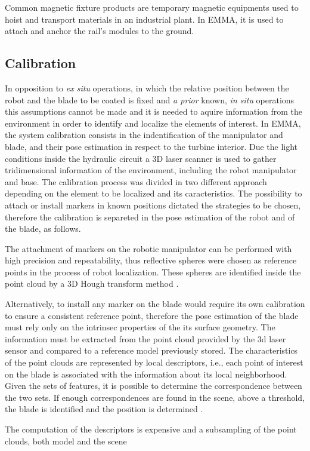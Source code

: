 Common magnetic fixture products are temporary magnetic equipments used to hoist
and transport materials in an industrial plant. In EMMA, it is used to attach
and anchor the rail's modules to the ground.


\subsection{Calibration}

In opposition to \textit{ex situ} operations, in which the relative position
between the robot and the blade to be coated is fixed and \textit{a prior}
known, \textit{in situ} operations this assumptions cannot be made and it
is needed to aquire information from the environment in order to identify
and localize the elements of interest. In EMMA, the system calibration consists
in the indentification of the manipulator and blade, and their
pose estimation in respect to the turbine interior. Due the light conditions
inside the hydraulic circuit  a 3D laser scanner is used to gather
tridimensional information of the environment, including the robot manipulator
and base. The calibration process was divided in two different approach
depending on the element to be localized and its caracteristics. The possibility
to attach or install markers in known positions dictated the strategies to be
chosen, therefore the calibration is separeted in the pose estimation of the
robot and of the blade, as follows.
 
The attachment of markers on the robotic manipulator can be performed with high
precision and repeatability, thus reflective spheres were chosen as reference
points in the process of robot localization. These spheres are identified inside
the point cloud by a 3D Hough transform method \cite{camurri20143d}.

Alternatively, to install any marker on the
blade would require its own calibration to ensure a consistent reference point,
therefore the pose estimation of the blade must rely only on the intrinsec
properties of the its surface geometry. The information must be extracted from
the point cloud provided by the 3d laser sensor and compared to a reference
model previously stored. The characteristics of the point clouds are represented
by local descriptors, i.e., each point of interest on the blade is associated
with the information about its local neighborhood. Given the
sets of features,  it is possible to determine the correspondence between the
two sets. If enough correspondences are found in the scene, above a threshold,
the blade is identified and the position is determined \cite{Tombari2010a}. 

The computation of the descriptors is expensive and a subsampling of the point
clouds, both model and the scene 
